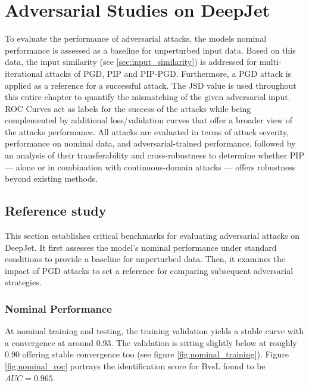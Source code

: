 \chapter{Adversarial Studies on DeepJet}

To evaluate the performance of adversarial attacks, the models nominal performance is assessed as a baseline for unperturbed input data. Based on this data, the input similarity (see \ref{sec:input_similarity}) is addressed for multi-iterational attacks of PGD, PIP and PIP-PGD. Furthermore, a PGD attack is applied as a reference for a successful attack. The JSD value is used throughout this entire chapter to quantify the mismatching of the given adversarial input. ROC Curves act as labels for the success of the attacks while being complemented by additional loss/validation curves that offer a broader view of the attacks performance. All attacks are evaluated in terms of attack severity, performance on nominal data, and adversarial-trained performance, followed by an analysis of their transferability and cross-robustness to determine whether PIP — alone or in combination with continuous-domain attacks — offers robustness beyond existing methods.

\section{Reference study}

This section establishes critical benchmarks for evaluating adversarial attacks on DeepJet. It first assesses the model's nominal performance under standard conditions to provide a baseline for unperturbed data. Then, it examines the impact of PGD attacks to set a reference for comparing subsequent adversarial strategies.

\subsection{Nominal Performance}

At nominal training and testing, the training validation yields a stable curve with a convergence at around 0.93. The validation is sitting slightly below at roughly 0.90 offering stable convergence too (see figure \ref{fig:nominal_training}). Figure \ref{fig:nominal_roc} portrays the identification score for BvsL found to be $AUC=0.965$.

